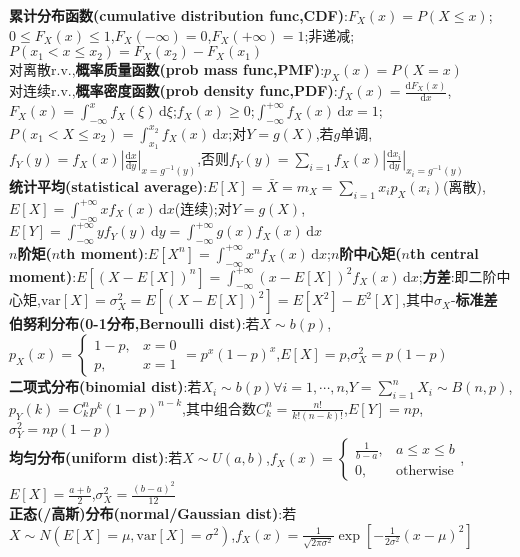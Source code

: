\documentclass[UTF8,a4paper,10pt]{article}
\providecommand{\abs}[1]{\left\lvert#1\right\rvert}
\begin{document}
\begin{multicols}{2}
    \textbf{累计分布函数(cumulative distribution func,CDF)}:$F_X(x)=P(X\leq x)$;$0\leq F_X(x)\leq 1$,$F_X(-\infty)=0$,$F_X(+\infty)=1$;非递减;$P(x_1<x\leq x_2)=F_X(x_2)-F_X(x_1)$\\
    对离散r.v.,\textbf{概率质量函数(prob mass func,PMF)}:$p_X(x)=P(X=x)$\\
    对连续r.v.,\textbf{概率密度函数(prob density func,PDF)}:$f_X(x)=\frac{\mathrm{d}F_X(x)}{\mathrm{d}x}$,$F_X(x)=\int_{-\infty}^xf_X(\xi)\,\mathrm{d}\xi$;$f_X(x)\geq 0$;$\int_{-\infty}^{+\infty}f_X(x)\,\mathrm{d}x=1$;$P(x_1<X\leq x_2)=\int_{x_1}^{x_2}f_X(x)\,\mathrm{d}x$;对$Y=g(X)$,若$g$单调,$f_Y(y)=f_X(x)\abs{\frac{\mathrm{d}x}{\mathrm{d}y}}_{x=g^{-1}(y)}$,否则$f_Y(y)=\sum_{i=1}f_X(x)\abs{\frac{\mathrm{d}x_i}{\mathrm{d}y}}_{x_i=g^{-1}(y)}$\\
    \textbf{统计平均(statistical average)}:$E[X]=\bar{X}=m_X=\sum_{i=1}x_ip_X(x_i)$(离散),$E[X]=\int_{-\infty}^{+\infty}xf_X(x)\,\mathrm{d}x$(连续);对$Y=g(X)$,$E[Y]=\int_{-\infty}^{+\infty}yf_Y(y)\,\mathrm{d}y=\int_{-\infty}^{+\infty}g(x)f_X(x)\,\mathrm{d}x$\\
    \textbf{$n$阶矩($n$th moment)}:$E[X^n]=\int_{-\infty}^{+\infty}x^nf_X(x)\,\mathrm{d}x$;\textbf{$n$阶中心矩($n$th central moment)}:$E[(X-E[X])^n]=\int_{-\infty}^{+\infty}(x-E[X])^2f_X(x)\,\mathrm{d}x$;\textbf{方差}:即二阶中心矩,$\mathrm{var}[X]=\sigma_X^2=E[(X-E[X])^2]=E[X^2]-E^2[X]$,其中$\sigma_X$-\textbf{标准差}\\
    \textbf{伯努利分布(0-1分布,Bernoulli dist)}:若$X\sim b(p)$,$p_X(x)=\left\{\begin{array}{ll}
        1-p,&x=0\\
        p,&x=1
    \end{array}\right.=p^x(1-p)^x$,$E[X]=p$,$\sigma_X^2=p(1-p)$\\
    \textbf{二项式分布(binomial dist)}:若$X_i\sim b(p)\forall i=1,\cdots,n$,$Y=\sum_{i=1}^nX_i\sim B(n,p)$,$p_Y(k)=C_k^np^k(1-p)^{n-k}$,其中组合数$C_k^n=\frac{n!}{k!(n-k)!}$,$E[Y]=np$,$\sigma_Y^2=np(1-p)$\\
    \textbf{均匀分布(uniform dist)}:若$X\sim U(a,b)$,$f_X(x)=\left\{\begin{array}{ll}
        \frac{1}{b-a},&a\leq x\leq b\\
        0,&\text{otherwise}
    \end{array}\right.$,$E[X]=\frac{a+b}{2}$,$\sigma_X^2=\frac{(b-a)^2}{12}$\\
    \textbf{正态(/高斯)分布(normal/Gaussian dist)}:若$X\sim N(E[X]=\mu,\mathrm{var}[X]=\sigma^2)$,$f_X(x)=\frac{1}{\sqrt{2\pi\sigma^2}}\exp[-\frac{1}{2\sigma^2}(x-\mu)^2]$\\

\end{multicols}
\end{document}
